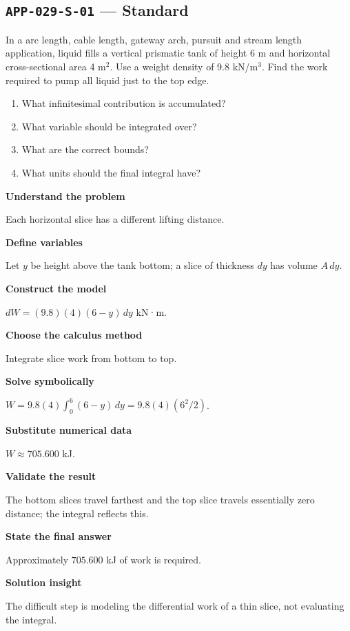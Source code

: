 \documentclass[11pt]{book}
\newcommand{\pid}[1]{\texttt{#1}}
\begin{document}
\subsection*{\pid{APP-029-S-01} — Standard}
\begin{problembox}
In a arc length, cable length, gateway arch, pursuit and stream length application, liquid fills a vertical prismatic tank of height 6 m and horizontal cross-sectional area 4 m$^2$. Use a weight density of 9.8 kN/m$^3$. Find the work required to pump all liquid just to the top edge.
\end{problembox}
\begin{promptbox}\begin{enumerate}
\item What infinitesimal contribution is accumulated?
\item What variable should be integrated over?
\item What are the correct bounds?
\item What units should the final integral have?
\end{enumerate}\end{promptbox}
\begin{solutionbox}
\textbf{Understand the problem}\par Each horizontal slice has a different lifting distance.\par\medskip
\textbf{Define variables}\par Let $y$ be height above the tank bottom; a slice of thickness $dy$ has volume $A\,dy$.\par\medskip
\textbf{Construct the model}\par $dW=(9.8)(4)(6-y)\,dy$ kN·m.\par\medskip
\textbf{Choose the calculus method}\par Integrate slice work from bottom to top.\par\medskip
\textbf{Solve symbolically}\par $W=9.8(4)\int_0^{6}(6-y)\,dy=9.8(4)(6^2/2)$.\par\medskip
\textbf{Substitute numerical data}\par $W\approx 705.600$ kJ.\par\medskip
\textbf{Validate the result}\par The bottom slices travel farthest and the top slice travels essentially zero distance; the integral reflects this.\par\medskip
\textbf{State the final answer}\par Approximately $705.600$ kJ of work is required.\par\medskip
\textbf{Solution insight}\par The difficult step is modeling the differential work of a thin slice, not evaluating the integral.\par\medskip
\end{solutionbox}
\end{document}
